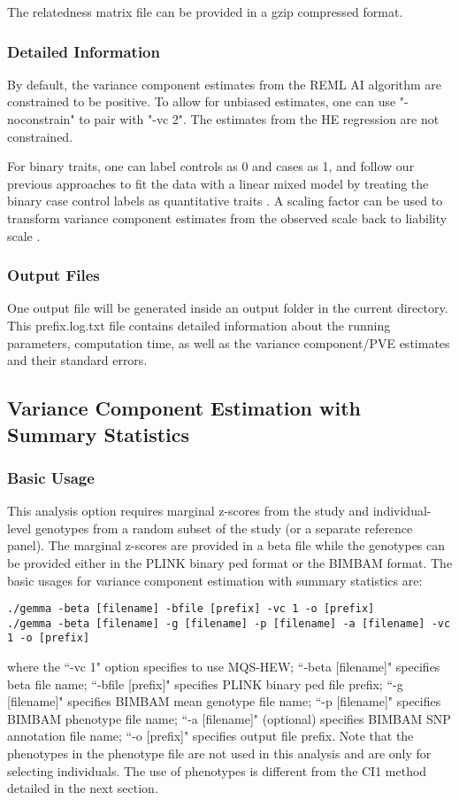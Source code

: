 \documentclass[11pt]{article}
\begin{document}
The relatedness matrix file can be provided in a gzip compressed format.



\subsubsection{Detailed Information}
By default, the variance component estimates from the REML AI algorithm are constrained to be positive. To allow for unbiased estimates, one can use "-noconstrain" to pair with "-vc 2". The estimates from the HE regression are not constrained. 

For binary traits, one can label controls as 0 and cases as 1, and follow our previous approaches to fit the data with a linear mixed model by treating the binary case control labels as quantitative traits \cite{Zhou:2013}. A scaling factor can be used to transform variance component estimates from the observed scale back to liability scale \cite{Zhou:2013}.


\subsubsection{Output Files}
One output file will be generated inside an output folder in the current directory. This prefix.log.txt file contains detailed information about the running parameters, computation time, as well as the variance component/PVE estimates and their standard errors.





\subsection{Variance Component Estimation with Summary Statistics}
\subsubsection{Basic Usage}
This analysis option requires marginal z-scores from the study and individual-level genotypes from a random subset of the study (or a separate reference panel). The marginal z-scores are provided in a beta file while the genotypes can be provided either in the PLINK binary ped format or the BIMBAM format. The basic usages for variance component estimation with summary statistics are:
\begin{verbatim}
./gemma -beta [filename] -bfile [prefix] -vc 1 -o [prefix]
./gemma -beta [filename] -g [filename] -p [filename] -a [filename] -vc 1 -o [prefix]
\end{verbatim}
where the ``-vc 1" option specifies to use MQS-HEW; ``-beta [filename]" specifies beta file name; ``-bfile [prefix]" specifies PLINK binary ped file prefix; ``-g [filename]" specifies BIMBAM mean genotype file name; ``-p [filename]" specifies BIMBAM phenotype file name; ``-a [filename]" (optional) specifies BIMBAM SNP annotation file name; ``-o [prefix]" specifies output file prefix. Note that the phenotypes in the phenotype file are not used in this analysis and are only for selecting individuals. The use of phenotypes is different from the CI1 method detailed in the next section.
\end{document}
